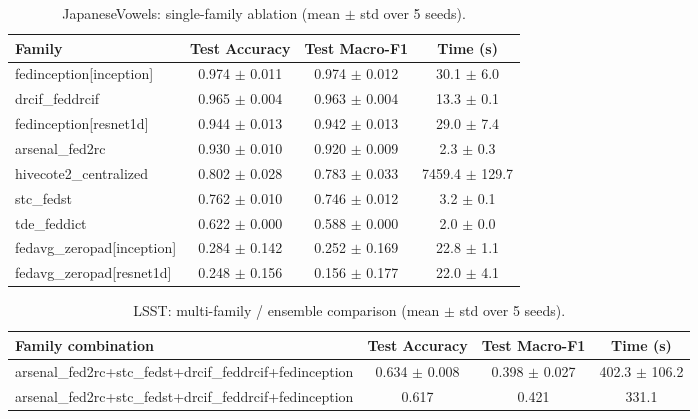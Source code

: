\begin{table}[t]
\centering
\caption{JapaneseVowels: single-family ablation (mean $\pm$ std over 5 seeds).}
\label{tab:results_japanesevowels_ablation}
\begin{tabular}{lccc}
\toprule
Family & Test Accuracy & Test Macro-F1 & Time (s) \\
\midrule
fedinception[inception] & 0.974 $\pm$ 0.011 & 0.974 $\pm$ 0.012 & 30.1 $\pm$ 6.0 \\
drcif\_feddrcif & 0.965 $\pm$ 0.004 & 0.963 $\pm$ 0.004 & 13.3 $\pm$ 0.1 \\
fedinception[resnet1d] & 0.944 $\pm$ 0.013 & 0.942 $\pm$ 0.013 & 29.0 $\pm$ 7.4 \\
arsenal\_fed2rc & 0.930 $\pm$ 0.010 & 0.920 $\pm$ 0.009 & 2.3 $\pm$ 0.3 \\
hivecote2\_centralized & 0.802 $\pm$ 0.028 & 0.783 $\pm$ 0.033 & 7459.4 $\pm$ 129.7 \\
stc\_fedst & 0.762 $\pm$ 0.010 & 0.746 $\pm$ 0.012 & 3.2 $\pm$ 0.1 \\
tde\_feddict & 0.622 $\pm$ 0.000 & 0.588 $\pm$ 0.000 & 2.0 $\pm$ 0.0 \\
fedavg\_zeropad[inception] & 0.284 $\pm$ 0.142 & 0.252 $\pm$ 0.169 & 22.8 $\pm$ 1.1 \\
fedavg\_zeropad[resnet1d] & 0.248 $\pm$ 0.156 & 0.156 $\pm$ 0.177 & 22.0 $\pm$ 4.1 \\
\bottomrule
\end{tabular}
\end{table}

\begin{table}[t]
\centering
\caption{LSST: multi-family / ensemble comparison (mean $\pm$ std over 5 seeds).}
\label{tab:results_lsst_ensemble}
\begin{tabular}{lccc}
\toprule
Family combination & Test Accuracy & Test Macro-F1 & Time (s) \\
\midrule
arsenal\_fed2rc+stc\_fedst+drcif\_feddrcif+fedinception & 0.634 $\pm$ 0.008 & 0.398 $\pm$ 0.027 & 402.3 $\pm$ 106.2 \\
arsenal\_fed2rc+stc\_fedst+drcif\_feddrcif+fedinception & 0.617 & 0.421 & 331.1 \\
\bottomrule
\end{tabular}
\end{table}

